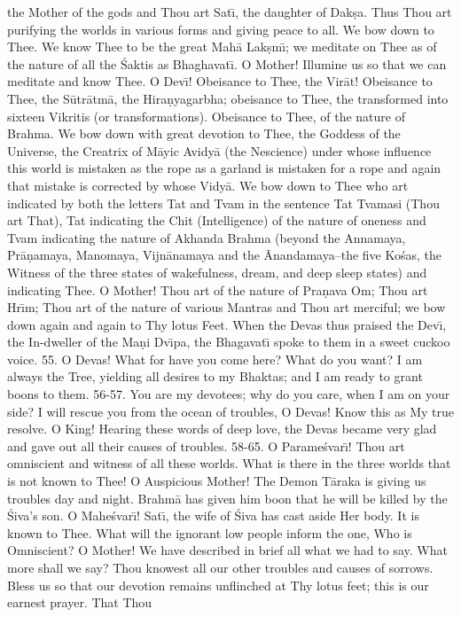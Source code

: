 the Mother of the gods and Thou art Sat\={\i}, the daughter of Dak\d{s}a. Thus Thou art purifying the worlds in various forms and giving peace to all. We bow down to Thee. We know Thee to be the great Mah\=a Lak\d{s}m\={\i}; we meditate on Thee as of the nature of all the \'Saktis as Bhaghavat\={\i}. O Mother! Illumine us so that we can meditate and know Thee. O Dev\={\i}! Obeisance to Thee, the Vir\=at! Obeisance to Thee, the S\=utr\=atm\=a, the Hira\d{n}yagarbha; obeisance to Thee, the transformed into sixteen Vikritis (or transformations). Obeisance to Thee, of the nature of Brahma. We bow down with great devotion to Thee, the Goddess of the Universe, the Creatrix of M\=ayic Avidy\=a (the Nescience) under whose influence this world is mistaken as the rope as a garland is mistaken for a rope and again that mistake is corrected by whose Vidy\=a.
We bow down to Thee who art indicated by both the letters Tat and Tvam in the sentence Tat Tvamasi (Thou art That), Tat indicating the Chit (Intelligence) of the nature of oneness and Tvam indicating the nature of Akhanda Brahma (beyond the Annamaya, Pr\=a\d{n}amaya, Manomaya, Vijn\=anamaya and the \=Anandamaya--the five Ko\'sas, the Witness of the three states of wakefulness, dream, and deep sleep states) and indicating Thee. O Mother! Thou art of the nature of Pra\d{n}ava Om; Thou art Hr\={\i}m; Thou art of the nature of various Mantras and Thou art merciful; we bow down again and again to Thy lotus Feet. When the Devas thus praised the Dev\={\i}, the In-dweller of the Ma\d{n}i Dv\={\i}pa, the Bhagavat\={\i} spoke to them in a sweet cuckoo voice.
55. O Devas! What for have you come here? What do you want? I am always the Tree, yielding all desires to my Bhaktas; and I am ready to grant boons to them.
56-57. You are my devotees; why do you care, when I am on your side? I will rescue you from the ocean of troubles, O Devas! Know this as My true resolve. O King! Hearing these words of deep love, the Devas became very glad and gave out all their causes of troubles.
58-65. O Parame\'svar\={\i}! Thou art omniscient and witness of all these worlds. What is there in the three worlds that is not known to Thee! O Auspicious Mother! The Demon T\=araka is giving us troubles day and night. Brahm\=a has given him boon that he will be killed by the \'Siva's son. O Mahe\'svar\={\i}! Sat\={\i}, the wife of \'Siva has cast aside Her body. It is known to Thee. What will the ignorant low people inform the one, Who is Omniscient? O Mother! We have described in brief all what we had to say. What more shall we say? Thou knowest all our other troubles and causes of sorrows. Bless us so that our devotion remains unflinched at Thy lotus feet; this is our earnest prayer. That Thou

